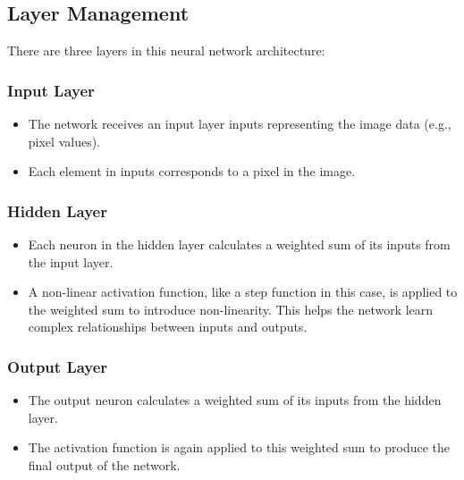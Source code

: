 \documentclass{article}
\begin{document}
\clearpage
\subsection{Layer Management}
There are three layers in this neural network architecture:
\subsubsection{Input Layer}
\begin{itemize}
    \item The network receives an input layer inputs representing the image data (e.g., pixel values).
    \item Each element in inputs corresponds to a pixel in the image.
\end{itemize}
\subsubsection{Hidden Layer}
\begin{itemize}
    \item Each neuron in the hidden layer calculates a weighted sum of its inputs from the input layer.
    \item A non-linear activation function, like a step function in this case, is applied to the weighted sum to introduce non-linearity. This helps the network learn complex relationships between inputs and outputs.  
\end{itemize}

   
 \subsubsection{Output Layer}
    \begin{itemize}
        \item The output neuron calculates a weighted sum of its inputs from the hidden layer.
\item The activation function is again applied to this weighted sum to produce the final output of the network.
          \end{itemize}
\end{document}
